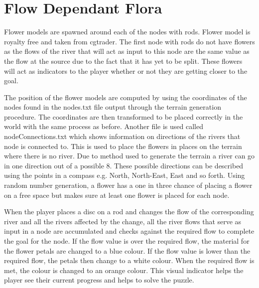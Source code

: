 \section{Flow Dependant Flora}
Flower models are spawned around each of the nodes with rods. Flower model is royalty free and taken from cgtrader\cite{flowermodel}. The first node with rods do not have flowers as the flows of the river that will act as input to this node are the same value as the flow at the source due to the fact that it has yet to be split. These flowers will act as indicators to the player whether or not they are getting closer to the goal.
\newline
\par
The position of the flower models are computed by using the coordinates of the nodes found in the nodes.txt file output through the terrain generation procedure. The coordinates are then transformed to be placed correctly in the world with the same process as before. Another file is used called nodeConnections.txt which shows information on directions of the rivers that node is connected to. This is used to place the flowers in places on the terrain where there is no river. Due to method used to generate the terrain a river can go in one direction out of a possible 8. These possible directions can be described using the points in a compass e.g. North, North-East, East and so forth. Using random number generation, a flower has a one in three chance of placing a flower on a free space but makes sure at least one flower is placed for each node.
\newline
\par
When the player places a disc on a rod and changes the flow of the corresponding river and all the rivers affected by the change, all the river flows that serve as input in a node are accumulated and checks against the required flow to complete the goal for the node. If the flow value is over the required flow, the material for the flower petals are changed to a blue colour. If the flow value is lower than the required flow, the petals then change to a white colour. When the required flow is met, the colour is changed to an orange colour. This visual indicator helps the player see their current progress and helps to solve the puzzle.

